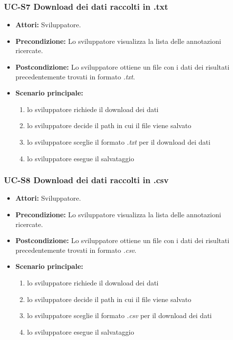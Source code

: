 \subsubsection{UC-S7 Download dei dati raccolti in .txt}
		\begin{itemize}
			\item \textbf{Attori:} Sviluppatore.
			\item \textbf{Precondizione:} Lo sviluppatore visualizza la lista delle annotazioni ricercate.
			\item \textbf{Postcondizione:} Lo sviluppatore ottiene un file con i dati dei risultati precedentemente trovati in formato \textit{.txt}.
			\item \textbf{Scenario principale:}
				\begin{enumerate}
					\item lo sviluppatore richiede il download dei dati
					\item lo sviluppatore decide il path in cui il file viene salvato
					\item lo sviluppatore sceglie il formato \textit{.txt} per il download dei dati
					\item lo sviluppatore esegue il salvataggio
				\end{enumerate}
		\end{itemize}

\subsubsection{UC-S8 Download dei dati raccolti in .csv}
		\begin{itemize}
			\item \textbf{Attori:} Sviluppatore.
			\item \textbf{Precondizione:} Lo sviluppatore visualizza la lista delle annotazioni ricercate.
			\item \textbf{Postcondizione:} Lo sviluppatore ottiene un file con i dati dei risultati precedentemente trovati in formato \textit{.csv}.
			\item \textbf{Scenario principale:}
				\begin{enumerate}
					\item lo sviluppatore richiede il download dei dati
					\item lo sviluppatore decide il path in cui il file viene salvato
					\item lo sviluppatore sceglie il formato \textit{.csv} per il download dei dati
					\item lo sviluppatore esegue il salvataggio
				\end{enumerate}
		\end{itemize}

